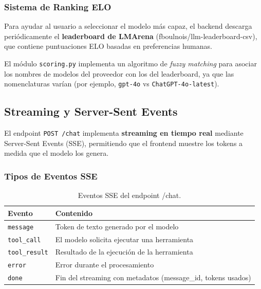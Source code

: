 \subsubsection{Sistema de Ranking ELO}

Para ayudar al usuario a seleccionar el modelo más capaz, el backend descarga periódicamente el \textbf{leaderboard de LMArena} (fboulnois/llm-leaderboard-csv), que contiene puntuaciones ELO basadas en preferencias humanas.

El módulo \texttt{scoring.py} implementa un algoritmo de \textit{fuzzy matching} para asociar los nombres de modelos del proveedor con los del leaderboard, ya que las nomenclaturas varían (por ejemplo, \texttt{gpt-4o} vs \texttt{ChatGPT-4o-latest}).

\subsection{Streaming y Server-Sent Events}

El endpoint \texttt{POST /chat} implementa \textbf{streaming en tiempo real} mediante Server-Sent Events (SSE), permitiendo que el frontend muestre los tokens a medida que el modelo los genera.

\subsubsection{Tipos de Eventos SSE}

\begin{table}[H]
\centering
\renewcommand{\arraystretch}{1.2}
\begin{tabular}{|l|p{8cm}|}
\hline
\rowcolor[gray]{0.85}
\textbf{Evento} & \textbf{Contenido} \\
\hline
\texttt{message} & Token de texto generado por el modelo \\
\hline
\texttt{tool\_call} & El modelo solicita ejecutar una herramienta \\
\hline
\texttt{tool\_result} & Resultado de la ejecución de la herramienta \\
\hline
\texttt{error} & Error durante el procesamiento \\
\hline
\texttt{done} & Fin del streaming con metadatos (message\_id, tokens usados) \\
\hline
\end{tabular}
\caption{Eventos SSE del endpoint /chat.}
\label{tab:eventos_sse}
\end{table}

